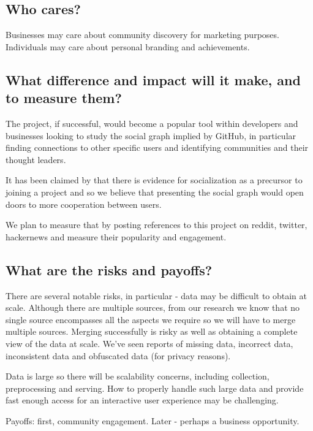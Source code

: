 \documentclass[sigconf,11pt]{acmart}
\begin{document}
\subsection*{Who cares?}
Businesses may care about community discovery for marketing purposes.
Individuals may care about personal branding and achievements.

\subsection*{What difference and impact will it make, and to measure them?}
The project, if successful, would become a popular tool within developers and businesses
looking to study the social graph implied by GitHub, in particular finding connections to other specific users
and identifying communities and their thought leaders.

It has been claimed by \citeauthor{developer-onboarding-github}\cite{developer-onboarding-github}
that there is evidence for socialization as a precursor to joining a project
and so we believe that presenting the social graph would open doors to more cooperation between users.

We plan to measure that by posting references to this project on reddit, twitter, hackernews and measure their
popularity and engagement.

\subsection*{What are the risks and payoffs?}
There are several notable risks, in particular - data may be difficult to obtain at scale.
Although there are multiple sources, from our research we know that no single source encompasses all the aspects
we require so we will have to merge multiple sources.
Merging successfully is risky as well as obtaining a complete view of the data at scale.
We've seen reports of missing data, incorrect data, inconsistent data and obfuscated data (for privacy reasons)\cite{promises-and-perils-mining-github}.

Data is large so there will be scalability concerns, including collection, preprocessing and serving.
How to properly handle such large data and provide fast enough access for an interactive user experience may be challenging.

Payoffs: first, community engagement. Later - perhaps a business opportunity.
\end{document}
